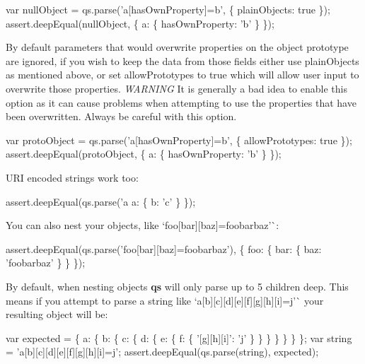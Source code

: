 \begin{DoxyCode}
var nullObject = qs.parse('a[hasOwnProperty]=b', \{ plainObjects: true \});
assert.deepEqual(nullObject, \{ a: \{ hasOwnProperty: 'b' \} \});
\end{DoxyCode}


By default parameters that would overwrite properties on the object prototype are ignored, if you wish to keep the data from those fields either use {\ttfamily plain\+Objects} as mentioned above, or set {\ttfamily allow\+Prototypes} to {\ttfamily true} which will allow user input to overwrite those properties. {\itshape W\+A\+R\+N\+I\+NG} It is generally a bad idea to enable this option as it can cause problems when attempting to use the properties that have been overwritten. Always be careful with this option.


\begin{DoxyCode}
var protoObject = qs.parse('a[hasOwnProperty]=b', \{ allowPrototypes: true \});
assert.deepEqual(protoObject, \{ a: \{ hasOwnProperty: 'b' \} \});
\end{DoxyCode}


U\+RI encoded strings work too\+:


\begin{DoxyCode}
assert.deepEqual(qs.parse('a%
    a: \{ b: 'c' \}
\});
\end{DoxyCode}


You can also nest your objects, like `\textquotesingle{}foo\mbox{[}bar\mbox{]}\mbox{[}baz\mbox{]}=foobarbaz'\`{}\+:


\begin{DoxyCode}
assert.deepEqual(qs.parse('foo[bar][baz]=foobarbaz'), \{
    foo: \{
        bar: \{
            baz: 'foobarbaz'
        \}
    \}
\});
\end{DoxyCode}


By default, when nesting objects {\bfseries qs} will only parse up to 5 children deep. This means if you attempt to parse a string like `\textquotesingle{}a\mbox{[}b\mbox{]}\mbox{[}c\mbox{]}\mbox{[}d\mbox{]}\mbox{[}e\mbox{]}\mbox{[}f\mbox{]}\mbox{[}g\mbox{]}\mbox{[}h\mbox{]}\mbox{[}i\mbox{]}=j'\`{} your resulting object will be\+:


\begin{DoxyCode}
var expected = \{
    a: \{
        b: \{
            c: \{
                d: \{
                    e: \{
                        f: \{
                            '[g][h][i]': 'j'
                        \}
                    \}
                \}
            \}
        \}
    \}
\};
var string = 'a[b][c][d][e][f][g][h][i]=j';
assert.deepEqual(qs.parse(string), expected);
\end{DoxyCode}


